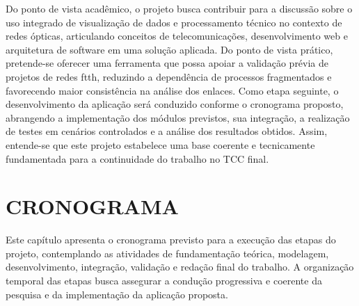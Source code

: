Do ponto de vista acadêmico, o projeto busca contribuir para a discussão sobre o uso integrado de visualização de dados e processamento técnico no contexto de redes ópticas, articulando conceitos de telecomunicações, desenvolvimento web e arquitetura de software em uma solução aplicada. Do ponto de vista prático, pretende-se oferecer uma ferramenta que possa apoiar a validação prévia de projetos de redes \gls{ftth}, reduzindo a dependência de processos fragmentados e favorecendo maior consistência na análise dos enlaces. Como etapa seguinte, o desenvolvimento da aplicação será conduzido conforme o cronograma proposto, abrangendo a implementação dos módulos previstos, sua integração, a realização de testes em cenários controlados e a análise dos resultados obtidos. Assim, entende-se que este projeto estabelece uma base coerente e tecnicamente fundamentada para a continuidade do trabalho no TCC final.

\section{CRONOGRAMA}

Este capítulo apresenta o cronograma previsto para a execução das etapas do projeto, contemplando as atividades de fundamentação teórica, modelagem, desenvolvimento, integração, validação e redação final do trabalho. A organização temporal das etapas busca assegurar a condução progressiva e coerente da pesquisa e da implementação da aplicação proposta.

